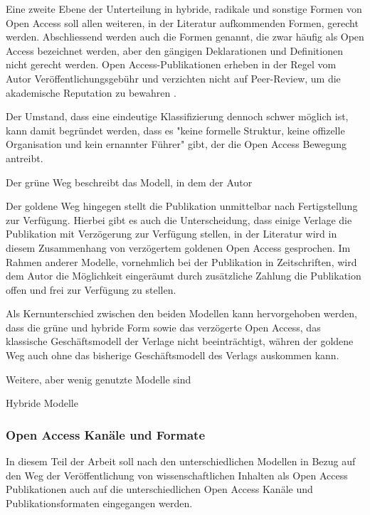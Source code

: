 {Eine zweite Ebene der Unterteilung in hybride, radikale und sonstige Formen von Open Access soll allen weiteren, in der Literatur aufkommenden Formen, gerecht werden. Abschliessend werden auch die Formen genannt, die zwar häufig als Open Access bezeichnet werden, aber den gängigen Deklarationen \cite{boai_2012} und Definitionen nicht gerecht werden. Open Access-Publikationen erheben in der Regel vom Autor Veröffentlichungsgebühr und verzichten nicht auf Peer-Review, um die akademische Reputation zu bewahren \cite{albert_2006_open_implications}.

Der Umstand, dass eine eindeutige Klassifizierung dennoch schwer möglich ist, kann damit begründet werden, dass es "keine formelle Struktur, keine offizelle Organisation und kein ernannter Führer" gibt, der die Open Access Bewegung antreibt\cite{poynder_2011_suber}.

Der grüne Weg beschreibt das Modell, in dem der Autor

Der goldene Weg hingegen stellt die Publikation unmittelbar nach Fertigstellung zur Verfügung. Hierbei gibt es auch die Unterscheidung, dass einige Verlage die Publikation mit Verzögerung zur Verfügung stellen, in der Literatur wird in diesem Zusammenhang von verzögertem goldenen Open Access gesprochen\cite{lewis_2012_inevitability}. Im Rahmen anderer Modelle, vornehmlich bei der Publikation in Zeitschriften, wird dem Autor die Möglichkeit eingeräumt durch zusätzliche Zahlung die Publikation offen und frei zur Verfügung zu stellen\cite{lewis_2012_inevitability}.

Als Kernunterschied zwischen den beiden Modellen kann hervorgehoben werden, dass die grüne und hybride Form sowie das verzögerte Open Access, das klassische Geschäftsmodell der Verlage nicht beeinträchtigt, währen der goldene Weg auch ohne das bisherige Geschäftsmodell des Verlags auskommen kann\cite{lewis_2012_inevitability}.

Weitere, aber wenig genutzte Modelle sind

Hybride Modelle

\subsubsection{Open Access Kanäle und Formate}
In diesem Teil der Arbeit soll nach den unterschiedlichen Modellen in Bezug auf den Weg der Veröffentlichung von wissenschaftlichen Inhalten als Open Access Publikationen auch auf die unterschiedlichen Open Access Kanäle und Publikationsformaten eingegangen werden.

}
